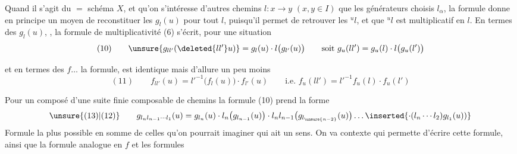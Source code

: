 Quand il s'agit du $=$ schéma $X$, et qu'on s'intéresse  d'autres chemins $l:x\longrightarrow y$ $(x,y\in I)$ que les générateurs choisis $l_\alpha$, la formule donne en principe un moyen de reconstituer les $g_l(u)$ pour tout $l$, puisqu'il permet de retrouver les ${}^u l$, et que ${}^u l$ est multiplicatif en $l$. En termes des $g_l(u)$, , la formule de multiplicativité (6) s'écrit, pour une situation
\[
(10)\qquad \unsure{g_{ll'}(\deleted{ll'}u)}=g_l(u)\cdot l\bigl(g_{l'}(u)\bigr)
\qquad\text{soit }g_u(ll')=g_u(l)\cdot l\bigl(g_u(l')\bigr)
\]

et en termes des $f\ldots$ la formule, est identique mais d'allure un peu moins 
\[
(11)\qquad f_{ll'}(u)=l'^{-1}\bigl(f_l(u)\bigr)\cdot f_{l'}(u)
\qquad\text{i.e. }f_u(ll')=l'^{-1}f_u(l)\cdot f_u(l')
\]


Pour un composé d'une  suite finie composable de chemins
la formule (10) prend la forme
\[
\unsure{(13)|(12)}\qquad
 g_{l_nl_{n-1}\cdots l_1}(u)=g_{l_n}(u)\cdot l_n\bigl(g_{l_{n-1}}(u)\bigr)\cdot l_nl_{n-1}\bigl(g_{l_{\unsure{n-2}}}(u)\bigr)\ldots
 \inserted{\cdot(l_n\cdots l_2)g_{l_1}(u))}
\]
Formule la plus   possible en somme de celles qu'on pourrait imaginer qui ait un sens. On va    contexte qui permette  d'écrire cette formule, ainsi que  la formule analogue en $f$ et les formules

